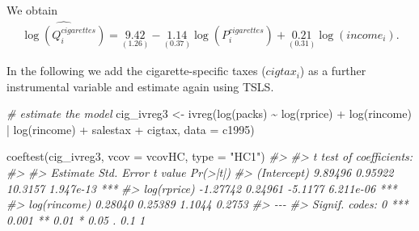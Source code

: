\documentclass[
  14pt,
]{memoir}
\newenvironment{Shaded}{\begin{snugshade}}{\end{snugshade}}
\newcommand{\AttributeTok}[1]{\textcolor[rgb]{0.77,0.63,0.00}{#1}}
\newcommand{\CommentTok}[1]{\textcolor[rgb]{0.56,0.35,0.01}{\textit{#1}}}
\newcommand{\FunctionTok}[1]{\textcolor[rgb]{0.00,0.00,0.00}{#1}}
\newcommand{\NormalTok}[1]{#1}
\newcommand{\OtherTok}[1]{\textcolor[rgb]{0.56,0.35,0.01}{#1}}
\newcommand{\SpecialCharTok}[1]{\textcolor[rgb]{0.00,0.00,0.00}{#1}}
\newcommand{\StringTok}[1]{\textcolor[rgb]{0.31,0.60,0.02}{#1}}
\begin{document}
We obtain
\begin{align}
  \widehat{\log(Q_i^{cigarettes})} = \underset{(1.26)}{9.42} - \underset{(0.37)}{1.14} \log(P_i^{cigarettes}) + \underset{(0.31)}{0.21} \log(income_i). \label{eq:emcigstsls2}
\end{align}

In the following we add the cigarette-specific taxes (\(cigtax_i\)) as a further instrumental variable and estimate again using TSLS.

\begin{Shaded}
\end{Shaded}

\begin{Shaded}
\begin{Highlighting}[]
\CommentTok{\# estimate the model}
\NormalTok{cig\_ivreg3 }\OtherTok{\textless{}{-}} \FunctionTok{ivreg}\NormalTok{(}\FunctionTok{log}\NormalTok{(packs) }\SpecialCharTok{\textasciitilde{}} \FunctionTok{log}\NormalTok{(rprice) }\SpecialCharTok{+} \FunctionTok{log}\NormalTok{(rincome) }\SpecialCharTok{|} 
                    \FunctionTok{log}\NormalTok{(rincome) }\SpecialCharTok{+}\NormalTok{ salestax }\SpecialCharTok{+}\NormalTok{ cigtax, }
                    \AttributeTok{data =}\NormalTok{ c1995)}

\FunctionTok{coeftest}\NormalTok{(cig\_ivreg3, }\AttributeTok{vcov =}\NormalTok{ vcovHC, }\AttributeTok{type =} \StringTok{"HC1"}\NormalTok{)}
\CommentTok{\#\textgreater{} }
\CommentTok{\#\textgreater{} t test of coefficients:}
\CommentTok{\#\textgreater{} }
\CommentTok{\#\textgreater{}              Estimate Std. Error t value  Pr(\textgreater{}|t|)    }
\CommentTok{\#\textgreater{} (Intercept)   9.89496    0.95922 10.3157 1.947e{-}13 ***}
\CommentTok{\#\textgreater{} log(rprice)  {-}1.27742    0.24961 {-}5.1177 6.211e{-}06 ***}
\CommentTok{\#\textgreater{} log(rincome)  0.28040    0.25389  1.1044    0.2753    }
\CommentTok{\#\textgreater{} {-}{-}{-}}
\CommentTok{\#\textgreater{} Signif. codes:  0 \textquotesingle{}***\textquotesingle{} 0.001 \textquotesingle{}**\textquotesingle{} 0.01 \textquotesingle{}*\textquotesingle{} 0.05 \textquotesingle{}.\textquotesingle{} 0.1 \textquotesingle{} \textquotesingle{} 1}
\end{Highlighting}
\end{Shaded}
\end{document}
